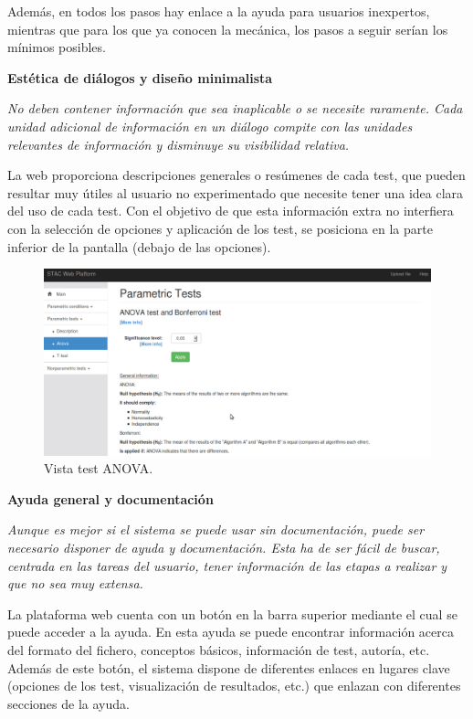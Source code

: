 Además, en todos los pasos hay enlace a la ayuda para usuarios inexpertos, mientras que para los que ya conocen la mecánica, los pasos a seguir serían los mínimos posibles.

\noindent
\textbf{Estética de diálogos y diseño minimalista}

\textit{No deben contener información que sea inaplicable o se necesite raramente. Cada unidad adicional de información en un diálogo compite con las unidades relevantes de información y disminuye su visibilidad relativa.}

La web proporciona descripciones generales o resúmenes de cada test, que pueden resultar muy útiles al usuario no experimentado que necesite tener una idea clara del uso de cada test. Con el objetivo de que esta información extra no interfiera con la selección de opciones y aplicación de los test, se posiciona en la parte inferior de la pantalla (debajo de las opciones).

\begin{figure}[H]
\centering
\includegraphics[scale=0.4]{figuras/nielsen_general.png}
\caption{Vista test ANOVA.}
\label{fig:nielsen_general}
\end{figure}

\noindent
\textbf{Ayuda general y documentación}

\textit{Aunque es mejor si el sistema se puede usar sin documentación, puede ser necesario disponer de ayuda y documentación. Esta ha de ser fácil de buscar, centrada en las tareas del usuario, tener información de las etapas a realizar y que no sea muy extensa.}

La plataforma web cuenta con un botón en la barra superior mediante el cual se puede acceder a la ayuda. En esta ayuda se puede encontrar información acerca del formato del fichero, conceptos básicos, información de test, autoría, etc. Además de este botón, el sistema dispone de diferentes enlaces en lugares clave (opciones de los test, visualización de resultados, etc.) que enlazan con diferentes secciones de la ayuda.


